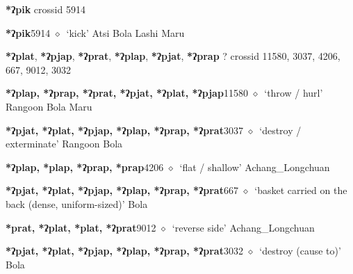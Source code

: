 \item
\textbf{*ʔpik}
  {\tiny crossid 5914}
  \begin{list}{}{\leftmargin=1.5em \itemindent=-1.5em}
  \item {\footnotesize \textbf{*ʔpik}}{\tiny 5914}
         $\diamond$~`kick'
         Atsi 
\hspace{1ex}
         Bola 
\hspace{1ex}
         Lashi 
\hspace{1ex}
         Maru 
  \end{list}
\item
\textbf{*ʔplat}, \textbf{*ʔpjap}, \textbf{*ʔprat}, \textbf{*ʔplap}, \textbf{*ʔpjat}, \textbf{*ʔprap}
?
  {\tiny crossid 11580, 3037, 4206, 667, 9012, 3032}
  \begin{list}{}{\leftmargin=1.5em \itemindent=-1.5em}
  \item {\footnotesize \textbf{*ʔplap, *ʔprap, *ʔprat, *ʔpjat, *ʔplat, *ʔpjap}}{\tiny 11580}
         $\diamond$~`throw / hurl'
         Rangoon 
\hspace{1ex}
         Bola 
\hspace{1ex}
         Maru 
  \item {\footnotesize \textbf{*ʔpjat, *ʔplat, *ʔpjap, *ʔplap, *ʔprap, *ʔprat}}{\tiny 3037}
\hspace{1ex}
         $\diamond$~`destroy / exterminate'
         Rangoon 
\hspace{1ex}
         Bola 
  \item {\footnotesize \textbf{*ʔplap, *plap, *ʔprap, *prap}}{\tiny 4206}
\hspace{1ex}
         $\diamond$~`flat / shallow'
         Achang\_Longchuan 
  \item {\footnotesize \textbf{*ʔpjat, *ʔplat, *ʔpjap, *ʔplap, *ʔprap, *ʔprat}}{\tiny 667}
\hspace{1ex}
         $\diamond$~`basket carried on the back (dense, uniform-sized)'
         Bola 
  \item {\footnotesize \textbf{*prat, *ʔplat, *plat, *ʔprat}}{\tiny 9012}
\hspace{1ex}
         $\diamond$~`reverse side'
         Achang\_Longchuan 
  \item {\footnotesize \textbf{*ʔpjat, *ʔplat, *ʔpjap, *ʔplap, *ʔprap, *ʔprat}}{\tiny 3032}
\hspace{1ex}
         $\diamond$~`destroy (cause to)'
         Bola 
  \end{list}

